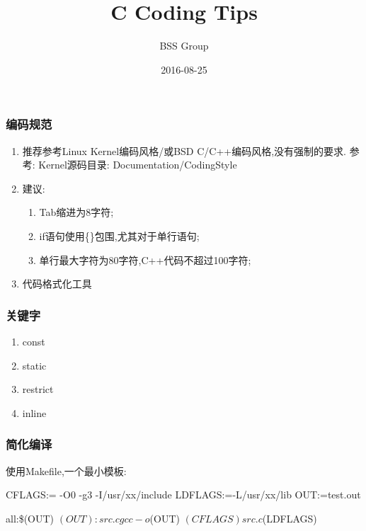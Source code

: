 ﻿


\title{C Coding Tips}
\author{BSS Group}
\date{2016-08-25}
\maketitle

\begin{frame}
\frametitle{编码规范}
\begin{enumerate}
        \item 推荐参考Linux Kernel编码风格/或BSD C/C++编码风格,没有强制的要求.
                参考: Kernel源码目录: Documentation/CodingStyle 

        \item 建议:
                \begin{enumerate}
                \item Tab缩进为8字符;
                \item if语句使用\{\}包围,尤其对于单行语句;
                \item 单行最大字符为80字符,C++代码不超过100字符;
                \end{enumerate}
        \item 代码格式化工具
\end{enumerate}
\end{frame}


\begin{frame}
\frametitle{关键字}

\begin{enumerate}
\item  const 
\item static 
\item restrict
\item inline
\end{enumerate}
\end{frame}


\begin{frame}
\frametitle{简化编译}
使用Makefile,一个最小模板:

CFLAGS:= -O0 -g3 -I/usr/xx/include
LDFLAGS:=-L/usr/xx/lib
OUT:=test.out

all:\$(OUT)
$(OUT): src.c
    gcc -o $(OUT) $(CFLAGS) src.c $(LDFLAGS) 
\end{frame}



